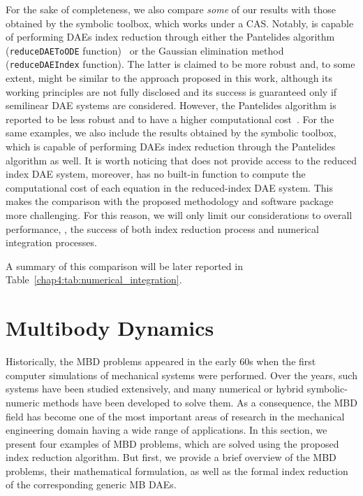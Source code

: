 For the sake of completeness, we also compare \emph{some} of our results with those obtained by the \Matlab{} symbolic toolbox, which works under a \MuPAD{} \ac{CAS}. Notably, \Matlab{} is capable of performing \acp{DAE} index reduction through either the Pantelides algorithm (\texttt{reduceDAEToODE} function)~\cite{pantelides1988consistent} or the Gaussian elimination method (\texttt{reduceDAEIndex} function). The latter is claimed to be more robust and, to some extent, might be similar to the approach proposed in this work, although its working principles are not fully disclosed and its success is guaranteed only if semilinear \ac{DAE} systems are considered. However, the Pantelides algorithm is reported to be less robust and to have a higher computational cost~\cite{matlabdaes}. For the same examples, we also include the results obtained by the \Mathematica{} symbolic toolbox, which is capable of performing \acp{DAE} index reduction through the Pantelides algorithm as well. It is worth noticing that \Mathematica{} does not provide access to the reduced index \ac{DAE} system, moreover, \Matlab{} has no built-in function to compute the computational cost of each equation in the reduced-index \ac{DAE} system. This makes the comparison with the proposed methodology and software package more challenging. For this reason, we will only limit our considerations to overall performance, \ie{}, the success of both index reduction process and numerical integration processes.

A summary of this comparison will be later reported in Table~\eqref{chap4:tab:numerical_integration}.

\section{Multibody Dynamics}
\label{chap4:sec:mbd}

Historically, the \ac{MBD} problems appeared in the early 60s when the first computer simulations of mechanical systems were performed. Over the years, such systems have been studied extensively, and many numerical or hybrid symbolic-numeric methods have been developed to solve them. As a consequence, the \ac{MBD} field has become one of the most important areas of research in the mechanical engineering domain having a wide range of applications. In this section, we present four examples of \ac{MBD} problems, which are solved using the proposed index reduction algorithm. But first, we provide a brief overview of the \ac{MBD} problems, their mathematical formulation, as well as the formal index reduction of the corresponding generic \ac{MB} \acp{DAE}.

